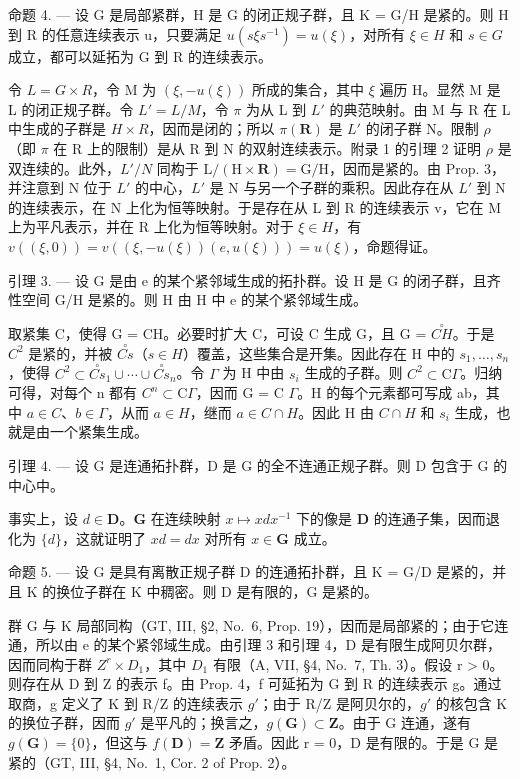命题 4. --- 设 G 是局部紧群，H 是 G 的闭正规子群，且 K = G/H 是紧的。则 H 到 R 的任意连续表示 u，只要满足 \(u(s\xi s^{-1}) = u(\xi)\)，对所有 \(\xi \in H\) 和 \(s \in G\) 成立，都可以延拓为 G 到 R 的连续表示。

令 \(L = G \times R\)，令 M 为 \((\xi, -u(\xi))\) 所成的集合，其中 \(\xi\) 遍历 H。显然 M 是 L 的闭正规子群。令 \(L' = L/M\)，令 \(\pi\) 为从 L 到 \(L'\) 的典范映射。由 M 与 R 在 L 中生成的子群是 \(H \times R\)，因而是闭的；所以 \(\pi(\mathbf{R})\) 是 \(L'\) 的闭子群 N。限制 \(\rho\)（即 \(\pi\) 在 R 上的限制）是从 R 到 N 的双射连续表示。附录 1 的引理 2 证明 \(\rho\) 是双连续的。此外，\(L'/N\) 同构于 \(\mathrm{L}/(\mathrm{H} \times \mathbf{R}) = \mathrm{G}/\mathrm{H}\)，因而是紧的。由 Prop. 3，并注意到 N 位于 \(L'\) 的中心，\(L'\) 是 N 与另一个子群的乘积。因此存在从 \(L'\) 到 N 的连续表示，在 N 上化为恒等映射。于是存在从 L 到 R 的连续表示 v，它在 M 上为平凡表示，并在 R 上化为恒等映射。对于 \(\xi \in H\)，有 \(v((\xi,0)) = v((\xi,-u(\xi))(e,u(\xi))) = u(\xi)\)，命题得证。

引理 3. --- 设 G 是由 e 的某个紧邻域生成的拓扑群。设 H 是 G 的闭子群，且齐性空间 G/H 是紧的。则 H 由 H 中 e 的某个紧邻域生成。

取紧集 C，使得 G = CH。必要时扩大 C，可设 C 生成 G，且 G = \(\overset{\circ}{CH}\)。于是 \(C^{2}\) 是紧的，并被 \(\overset{\circ}{Cs}\)（\(s \in H\)）覆盖，这些集合是开集。因此存在 H 中的 \(s_{1}, \ldots, s_{n}\)，使得 \(C^{2} \subset \overset{\circ}{Cs}_{1} \cup \cdots \cup \overset{\circ}{Cs}_{n}\)。令 \(\Gamma\) 为 H 中由 \(s_{i}\) 生成的子群。则 \(C^{2} \subset \mathrm{C}\Gamma\)。归纳可得，对每个 n 都有 \(C^{n} \subset \mathrm{C}\Gamma\)，因而 G = C \(\Gamma\)。H 的每个元素都可写成 ab，其中 \(a \in C\)、\(b \in \Gamma\)，从而 \(a \in H\)，继而 \(a \in C \cap H\)。因此 H 由 \(C \cap H\) 和 \(s_{i}\) 生成，也就是由一个紧集生成。

引理 4. --- 设 G 是连通拓扑群，D 是 G 的全不连通正规子群。则 D 包含于 G 的中心中。

事实上，设 \(d \in \mathbf{D}\)。\(\mathbf{G}\) 在连续映射 \(x \mapsto x dx^{-1}\) 下的像是 \(\mathbf{D}\) 的连通子集，因而退化为 \(\{d\}\)，这就证明了 \(xd = dx\) 对所有 \(x \in \mathbf{G}\) 成立。

命题 5. --- 设 G 是具有离散正规子群 D 的连通拓扑群，且 K = G/D 是紧的，并且 K 的换位子群在 K 中稠密。则 D 是有限的，G 是紧的。

群 G 与 K 局部同构（GT, III, §2, No.~6, Prop. 19），因而是局部紧的；由于它连通，所以由 e 的某个紧邻域生成。由引理 3 和引理 4，D 是有限生成阿贝尔群，因而同构于群 \(Z^{r} \times D_{1}\)，其中 \(D_{1}\) 有限（A, VII, §4, No.~7, Th. 3）。假设 r \textgreater{} 0。则存在从 D 到 Z 的表示 f。由 Prop. 4，f 可延拓为 G 到 R 的连续表示 g。通过取商，g 定义了 K 到 R/Z 的连续表示 \(g'\)；由于 R/Z 是阿贝尔的，\(g'\) 的核包含 K 的换位子群，因而 \(g'\) 是平凡的；换言之，\(g(\mathbf{G}) \subset \mathbf{Z}\)。由于 G 连通，遂有 \(g(\mathbf{G}) = \{0\}\)，但这与 \(f(\mathbf{D}) = \mathbf{Z}\) 矛盾。因此 r = 0，D 是有限的。于是 G 是紧的（GT, III, §4, No.~1, Cor. 2 of Prop. 2）。
